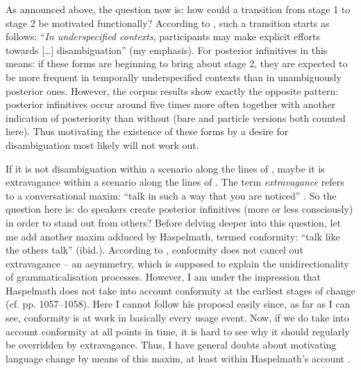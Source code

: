 \documentclass[output=paper,hidelinks]{langscibook}
\begin{document}
As announced above, the question now is: how could a transition from stage 1 to stage 2 be motivated functionally? According to \citet[23]{Deo_2015}, such a transition starts as follows: “\emph{In underspecified contexts}, participants may make explicit efforts towards […] disambiguation” (my emphasis). For posterior infinitives in  this means: if these forms are beginning to bring about stage 2, they are expected to be more frequent in temporally underspecified contexts than in unambiguously posterior ones. However, the corpus results show exactly the opposite pattern: posterior infinitives occur around five times more often together with another indication of posteriority than without (bare and particle versions both counted here). Thus motivating the existence of these forms by a desire for disambiguation most likely will not work out.

If it is not disambiguation within a scenario along the lines of \citet{Deo_2015}, maybe it is extravagance within a scenario along the lines of \citet{Haspelmath1999}. The term \emph{extravagance} refers to a conversational maxim: “talk in such a way that you are noticed” \citep[1055]{Haspelmath1999}. So the question here is: do speakers create posterior infinitives (more or less consciously) in order to stand out from others? Before delving deeper into this question, let me add another maxim adduced by Haspelmath, termed conformity: “talk like the others talk” (ibid.). According to \citet[1063]{Haspelmath1999}, conformity does not cancel out extravagance – an asymmetry, which is supposed to explain the unidirectionality of grammaticalisation processes. However, I am under the impression that Haspelmath does not take into account conformity at the earliest stages of change (cf. pp. 1057–1058). Here I cannot follow his proposal easily since, as far as I can see, conformity is at work in basically every usage event. Now, if we do take into account conformity at all points in time, it is hard to see why it should regularly be overridden by extravagance. Thus, I have general doubts about motivating language change by means of this maxim, at least within Haspelmath’s account \citep{Haspelmath1999}.
\end{document}
